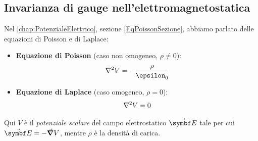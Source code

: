 \subsection{Invarianza di gauge nell'elettromagnetostatica}\label{invarianzagauge}
Nel \autoref{chap:PotenzialeElettrico}, sezione \ref{EqPoissonSezione}, abbiamo parlato delle equazioni di Poisson e di Laplace:
\begin{itemize}
	\item \textbf{Equazione di Poisson} (caso non omogeneo, $\rho\neq 0$):
	\begin{equation}
		\laplacian{V}=-\frac{\rho}{\epsilon_0}
	\end{equation}
	\item \textbf{Equazione di Laplace} (caso omogeneo, $\rho=0$):
	\begin{equation}
		\laplacian{V}=0
	\end{equation}
\end{itemize}
Qui $V$ è il \textit{potenziale scalare} del campo elettrostatico $\vba{E}$ tale per cui $\vba{E}=-\grad{V}$, mentre $\rho$ è la densità di carica.

